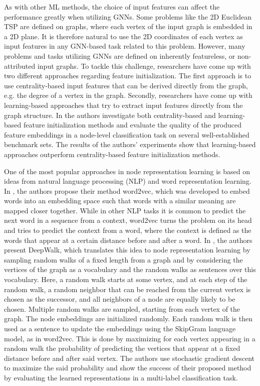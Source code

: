 \documentclass[draft,final]{vutinfth} %
\begin{document}
As with other ML methods, the choice of input features can affect the performance greatly when utilizing GNNs. 
Some problems like the 2D Euclidean TSP are defined on graphs, where each vertex of the input graph is embedded in a 2D plane. It is therefore natural to use the 2D coordinates of each vertex as input features in any GNN-based task related to this problem. 
However, many problems and tasks utilizing GNNs are defined on inherently featureless, or non-attributed input graphs. 
To tackle this challenge, researchers have come up with two different approaches regarding feature initialization. The first approach is to use centrality-based input features that can be derived directly from the graph, e.g. the degree of a vertex in the graph. Secondly, researchers have come up with learning-based approaches that try to extract input features directly from the graph structure. In \cite{Duong2019} the authors investigate both centrality-based and learning-based feature initialization methods and evaluate the quality of the produced feature embeddings in a node-level classification task on several well-established benchmark sets. The results of the authors' experiments show that learning-based approaches outperform centrality-based feature initialization methods. 

One of the most popular approaches in node representation learning is based on ideas from natural language processing (NLP) and word representation learning. In \cite{Mikolov2013}, the authors propose their method word2vec, which was developed to embed words into an embedding space such that words with a similar meaning are mapped closer together. While in other NLP tasks it is common to predict the next word in a sequence from a context, word2vec turns the problem on its head and tries to predict the context from a word, where the context is defined as the words that appear at a certain distance before and after a word. 
In \cite{Perozzi2014}, the authors present DeepWalk, which translates this idea to node representation learning by sampling random walks of a fixed length from a graph and by considering the vertices of the graph as a vocabulary and the random walks as sentences over this vocabulary. Here, a random walk starts at some vertex, and at each step of the random walk, a random neighbor that can be reached from the current vertex is chosen as the successor, and all neighbors of a node are equally likely to be chosen. Multiple random walks are sampled, starting from each vertex of the graph. 
The node embeddings are initialized randomly. Each random walk is then used as a sentence to update the embeddings using the SkipGram language model, as in word2vec. This is done by maximizing for each vertex appearing in a random walk the probability of predicting the vertices that appear at a fixed distance before and after said vertex. The authors use stochastic gradient descent to maximize the said probability and show the success of their proposed method by evaluating the learned representations in a multi-label classification task. 
\end{document}
